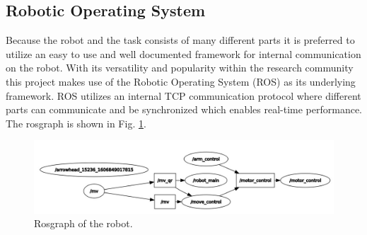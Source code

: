 \subsection{Robotic Operating System}
Because the robot and the task consists of many different parts it is preferred to utilize an easy to use and well documented framework for internal communication on the robot. With its versatility and popularity within the research community this project makes use of the Robotic Operating System (ROS) as its underlying framework. 
ROS utilizes an internal TCP communication protocol where different parts can communicate and be synchronized which enables real-time performance. 
The rosgraph is shown in Fig. \ref{fig:rosgraph}. 

\begin{figure}
    \centering
    \includegraphics[width=0.7\columnwidth]{chapters/img/rosgraph.jpg}
    \caption{Rosgraph of the robot.}
    \label{fig:rosgraph}
\end{figure}



